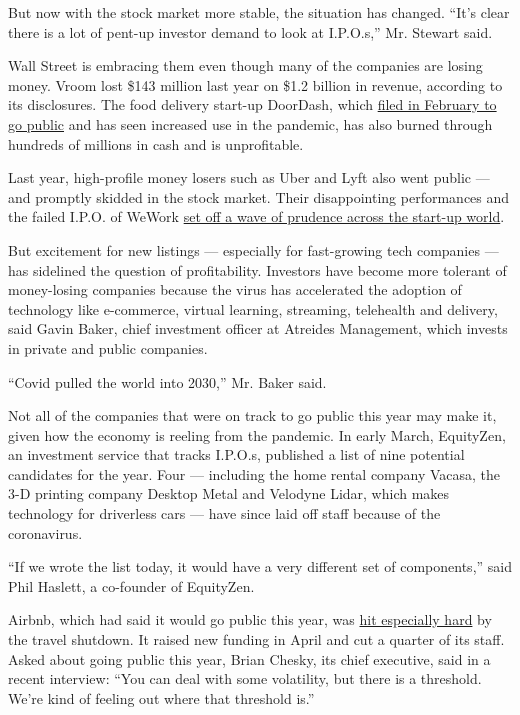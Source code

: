But now with the stock market more stable, the situation has changed.
``It's clear there is a lot of pent-up investor demand to look at
I.P.O.s,'' Mr. Stewart said.

Wall Street is embracing them even though many of the companies are
losing money. Vroom lost \$143 million last year on \$1.2 billion in
revenue, according to its disclosures. The food delivery start-up
DoorDash, which
\href{https://www.nytimes3xbfgragh.onion/2020/03/04/technology/doordash-ipo.html}{filed
in February to go public} and has seen increased use in the pandemic,
has also burned through hundreds of millions in cash and is
unprofitable.

Last year, high-profile money losers such as Uber and Lyft also went
public --- and promptly skidded in the stock market. Their disappointing
performances and the failed I.P.O. of WeWork
\href{https://www.nytimes3xbfgragh.onion/2019/10/08/technology/silicon-valley-startup-profit.html}{set
off a wave of prudence across the start-up world}.

But excitement for new listings --- especially for fast-growing tech
companies --- has sidelined the question of profitability. Investors
have become more tolerant of money-losing companies because the virus
has accelerated the adoption of technology like e-commerce, virtual
learning, streaming, telehealth and delivery, said Gavin Baker, chief
investment officer at Atreides Management, which invests in private and
public companies.

``Covid pulled the world into 2030,'' Mr. Baker said.

Not all of the companies that were on track to go public this year may
make it, given how the economy is reeling from the pandemic. In early
March, EquityZen, an investment service that tracks I.P.O.s, published a
list of nine potential candidates for the year. Four --- including the
home rental company Vacasa, the 3-D printing company Desktop Metal and
Velodyne Lidar, which makes technology for driverless cars --- have
since laid off staff because of the coronavirus.

``If we wrote the list today, it would have a very different set of
components,'' said Phil Haslett, a co-founder of EquityZen.

Airbnb, which had said it would go public this year, was
\href{https://www.nytimes3xbfgragh.onion/2020/04/06/technology/airbnb-coronavirus-valuation.html}{hit
especially hard} by the travel shutdown. It raised new funding in April
and cut a quarter of its staff. Asked about going public this year,
Brian Chesky, its chief executive, said in a recent interview: ``You can
deal with some volatility, but there is a threshold. We're kind of
feeling out where that threshold is.''

